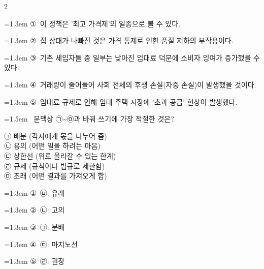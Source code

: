 \documentclass[10pt, a4paper]{article}
\begin{document}
\begin{multicols}{2}
\begin{minipage}{\columnwidth}
\vspace{0.5mm}
{\hangindent=1.3em  \noindent\hspace{0.3em}①~이 정책은 '최고 가격제'의 일종으로 볼 수 있다.\par}
{\hangindent=1.3em  \noindent\hspace{0.3em}②~집 상태가 나빠진 것은 가격 통제로 인한 품질 저하의 부작용이다.\par}
{\hangindent=1.3em  \noindent\hspace{0.3em}③~기존 세입자들 중 일부는 낮아진 임대료 덕분에 소비자 잉여가 증가했을 수 있다.\par}
{\hangindent=1.3em  \noindent\hspace{0.3em}④~거래량이 줄어들어 사회 전체의 후생 손실(자중 손실)이 발생했을 것이다.\par}
{\hangindent=1.3em  \noindent\hspace{0.3em}⑤~임대료 규제로 인해 임대 주택 시장에 '초과 공급' 현상이 발생했다.\par}
\vspace{4mm}
\end{minipage}
\par

\noindent\begin{minipage}{\columnwidth}
\vspace{2mm}
{\hangindent=1.5em  ~문맥상 ㉠\textasciitilde{}㉤과 바꿔 쓰기에 가장 적절한 것은?\par}

\vspace{1mm}
\begin{boxibox}
㉠ 배분 (각자에게 몫을 나누어 줌) \\
㉡ 용의 (어떤 일을 하려는 마음) \\
㉢ 상한선 (위로 올라갈 수 있는 한계) \\
㉣ 규제 (규칙이나 법규로 제한함) \\
㉤ 초래 (어떤 결과를 가져오게 함) \\
\end{boxibox}
\vspace{1mm}

\vspace{0.5mm}
{\hangindent=1.3em  \noindent\hspace{0.3em}①~㉤: 유래\par}
{\hangindent=1.3em  \noindent\hspace{0.3em}②~㉡: 고의\par}
{\hangindent=1.3em  \noindent\hspace{0.3em}③~㉠: 분배\par}
{\hangindent=1.3em  \noindent\hspace{0.3em}④~㉢: 마지노선\par}
{\hangindent=1.3em  \noindent\hspace{0.3em}⑤~㉣: 권장\par}
\vspace{4mm}
\end{minipage}
\par


\end{multicols}
\end{document}
